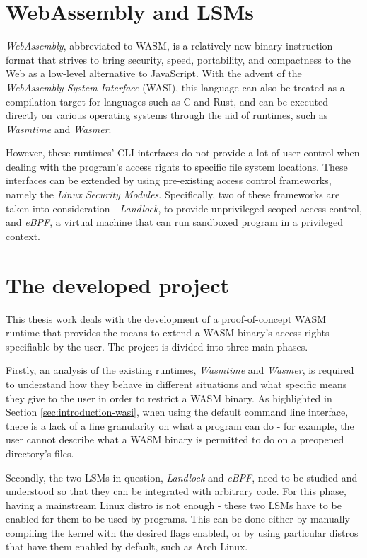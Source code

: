 \section{WebAssembly and LSMs}

\textit{WebAssembly}, abbreviated to WASM, is a relatively new binary instruction format that
strives to bring security, speed, portability, and compactness to the Web
as a low-level alternative to JavaScript.
With the advent of the \textit{WebAssembly System Interface} (WASI),
this language can also be treated as a compilation target for languages such as C and Rust,
and can be executed directly on various operating systems
through the aid of runtimes, such as \textit{Wasmtime} and \textit{Wasmer}.

However, these runtimes' CLI interfaces do not provide a lot of user control
when dealing with the program's access rights to specific file system locations.
These interfaces can be extended by using pre-existing access control frameworks,
namely the \textit{Linux Security Modules}.
Specifically, two of these frameworks are taken into consideration - \textit{Landlock},
to provide unprivileged scoped access control, and \textit{eBPF}, a virtual
machine that can run sandboxed program in a privileged context.

\section{The developed project}

This thesis work deals with the development of a proof-of-concept WASM runtime that
provides the means to extend a WASM binary's access rights specifiable by the user.
The project is divided into three main phases.

Firstly, an analysis of the existing runtimes, \textit{Wasmtime} and \textit{Wasmer},
is required to understand how they behave in different situations and what
specific means they give to the user in order to restrict a WASM binary.
As highlighted in Section \ref{sec:introduction-wasi}, when using the default command line
interface, there is a lack of a fine granularity on what a program can do - for example,
the user cannot describe what a WASM binary is permitted to do on a preopened directory's files.

Secondly, the two LSMs in question, \textit{Landlock} and \textit{eBPF}, need to be studied and understood
so that they can be integrated with arbitrary code.
For this phase, having a mainstream Linux distro is not enough - these two LSMs have to be enabled
for them to be used by programs. This can be done either by manually compiling the kernel with the desired
flags enabled, or by using particular distros that have them enabled by default, such as Arch Linux.

